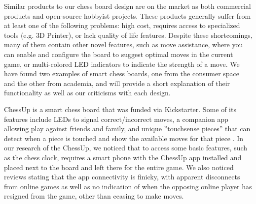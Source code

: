 \documentclass[11pt,journal]{IEEEtran}
\begin{document}
Similar products to our chess board design are on the market as both commercial products and open-source hobbyist projects. These products generally suffer from at least one of the following problems: high cost, requires access to specialized tools (e.g. 3D Printer), or lack quality of life features. Despite these shortcomings, many of them contain other novel features, such as move assistance, where you can enable and configure the board to suggest optimal moves in the current game, or multi-colored LED indicators to indicate the strength of a move. We have found two examples of smart chess boards, one from the consumer space and the other from academia, and will provide a short explanation of their functionality as well as our criticisms with each design.




ChessUp is a smart chess board that was funded via Kickstarter. Some of its features include LEDs to signal correct/incorrect moves, a companion app allowing play against friends and family, and unique ''touchsense pieces'' that can detect when a piece is touched and show the available moves for that piece \cite{chessup}. In our research of the ChessUp, we noticed that to access some basic features, such as the chess clock, requires a smart phone with the ChessUp app installed and placed next to the board and left there for the entire game. We also noticed reviews stating that the app connectivity is finicky, with apparent disconnects from online games as well as no indication of when the opposing online player has resigned from the game, other than ceasing to make moves.
\end{document}
